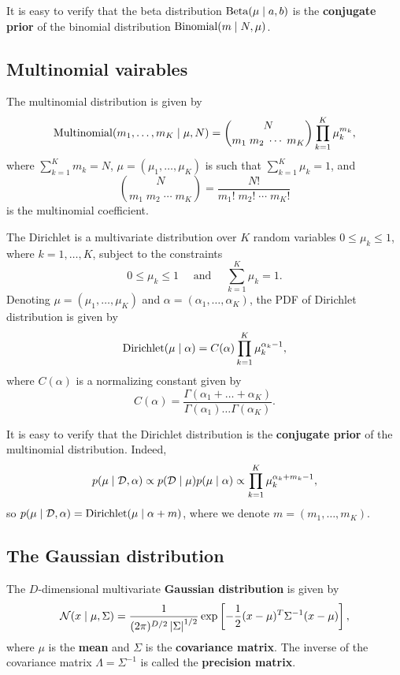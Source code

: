 \documentclass[a4paper]{article}
\begin{document}
It is easy to verify that the beta distribution $\operatorname{Beta}
(\mu \mid a, b)$ is  
the \textbf{conjugate prior} of the binomial distribution
$\operatorname{Binomial}(m \mid N, \mu)$.

\subsection{Multinomial vairables}

\begin{defi}
The multinomial distribution is given by 
\[
\operatorname{Multinomial}(m_1, \dots, m_K \mid \mu, N)
= \binom{N}{m_1 \; m_2 \; \cdots \; m_K} 
\prod_{k=1}^K \mu_k^{m_k},
\]
where $\sum_{k=1}^K m_k = N$, 
$\mu = (\mu_1, \dots, \mu_K)$ is such that 
$\sum_{k=1}^K \mu_k = 1$, and 
\[
\binom{N}{m_1 \; m_2 \; \cdots \; m_K}
= \frac{N!}{m_1! \; m_2! \; \cdots \; m_K!}
\]
is the multinomial coefficient.
\end{defi}

\begin{defi}
The Dirichlet is a multivariate distribution over $K$ 
random variables $0 \leq \mu_k \leq 1$,
where $k = 1, \dots, K$, subject to the constraints
\[
0 \leq \mu_k \leq 1 \quad 
\text{ and } \quad \sum_{k=1}^K \mu_k = 1.
\]
Denoting $\mu = (\mu_1, \dots, \mu_K)$ and 
$\alpha = (\alpha_1, \dots, \alpha_K)$,
the PDF of Dirichlet distribution is given by 
\[
\operatorname{Dirichlet}(\mu \mid \alpha)
= C(\alpha) \prod_{k=1}^K \mu_k^{\alpha_k - 1},
\]
where $C(\alpha)$ is a normalizing constant given by 
\[
C(\alpha) = \frac{\Gamma(\alpha_1 + \dots + \alpha_K)}
{\Gamma(\alpha_1) \dots \Gamma(\alpha_K)}.
\]
\end{defi}

It is easy to verify that the Dirichlet distribution
is the \textbf{conjugate prior} of the multinomial distribution. 
Indeed, 
\[
p(\mu \mid \mathcal{D}, \alpha)
\propto p(\mathcal{D} \mid \mu) p(\mu \mid \alpha) 
\propto \prod_{k=1}^K \mu_k^{\alpha_k + m_k - 1},
\]
so $p(\mu \mid \mathcal{D}, \alpha)
= \operatorname{Dirichlet}(\mu \mid \alpha + m)$, where we denote 
$m = (m_1, \dots, m_K)$.

\subsection{The Gaussian distribution}

\begin{defi}
The $D$-dimensional multivariate 
\textbf{Gaussian distribution} is given by 
\[
\mathcal{N} (x \mid \mu, \Sigma) 
= \frac{1}{(2\pi)^{D / 2} \left\lvert \Sigma\right\rvert^{1 / 2}}
\exp \left[ -\frac{1}{2} (x - \mu)^T \Sigma^{-1} (x - \mu) 
\right],
\]
where $\mu$ is the \textbf{mean} and $\Sigma$ is the 
\textbf{covariance matrix}.
The inverse of the covariance matrix $\Lambda = \Sigma^{-1}$ 
is called the \textbf{precision matrix}.
\end{defi}
\end{document}
